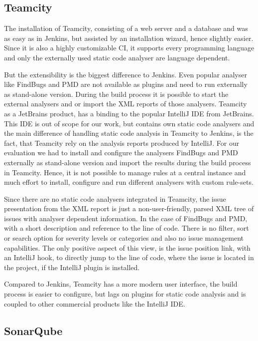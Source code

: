 \documentclass[conference]{IEEEtran}
\begin{document}
\subsection{Teamcity}
\label{subsec:evaluation_teamcity}


The installation of Teamcity, consisting of a web server and a database and was as easy as in Jenkins, but assisted by an installation wizard, hence slightly easier. 
Since it is also a highly customizable CI, it supports every programming language and only the externally used static code analyser are language dependent.


But the extensibility is the biggest difference to Jenkins.
Even popular analyser like FindBugs and PMD are not available as plugins and need to run externally as stand-alone version.
During the build process it is possible to start the external analysers and or import the XML reports of those analysers.
Teamcity as a JetBrains product, has a binding to the popular IntelliJ IDE from JetBrains.
This IDE is out of scope for our work, but contains own static code analysers and the main difference of handling static code analysis in Teamcity to Jenkins, is the fact, that Teamcity rely on the analysis reports produced by IntelliJ. 
For our evaluation we had to install and configure the analysers FindBugs and PMD externally as stand-alone version and import the results during the build process in Teamcity.
Hence, it is not possible to manage rules at a central instance and much effort to install, configure and run different analysers with custom rule-sets.


Since there are no static code analysers integrated in Teamcity, the issue presentation from the XML report is just a non-user-friendly, parsed XML tree of issues with analyser dependent information. In the case of FindBugs and PMD, with a short description and reference to the line of code.
There is no filter, sort or search option for severity levels or categories and also no issue management capabilities.
The only positive aspect of this view, is the issue position link, with an IntelliJ hook, to directly jump to the line of code, where the issue is located in the project, if the IntelliJ plugin is installed.


Compared to Jenkins, Teamcity has a more modern user interface, the build process is easier to configure, but lags on plugins for static code analysis and is coupled to other commercial products like the IntelliJ IDE.


\subsection{SonarQube}
\label{subsec:evaluation_sonarqube}
\end{document}
